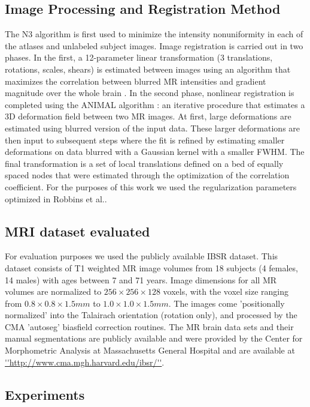 \documentclass{article}
\begin{document}
\subsection{Image Processing and Registration Method}
The N3 algorithm \cite{Sled1998} is first used to minimize the intensity
nonuniformity in each of the atlases and unlabeled subject images.  Image
registration is carried out in two phases.  In the first, a 12-parameter linear
transformation (3 translations, rotations, scales, shears) is estimated between
images using an algorithm that maximizes the correlation between blurred MR
intensities and gradient magnitude over the whole brain \cite{Collins}.  In the
second phase, nonlinear registration is completed using the ANIMAL algorithm
\cite{Collins1995}: an iterative procedure that estimates a 3D deformation
field between two MR images. At first, large deformations are estimated using
blurred version of the input data. These larger deformations are then input to
subsequent steps where the fit is refined by estimating smaller deformations on
data blurred with a Gaussian kernel with a smaller FWHM. The final
transformation is a set of local translations defined on a bed of equally
spaced nodes that were estimated through the optimization of the correlation
coefficient. For the purposes of this work we used the regularization
parameters optimized in Robbins et al.\cite{Robbins2004}.

\subsection{MRI dataset evaluated}

For evaluation purposes we used the publicly available IBSR dataset.  This
dataset consists of T1 weighted MR image volumes from 18 subjects (4 females,
14 males) with ages between 7 and 71 years. Image dimensions for all MR volumes
are normalized to  $256  \times 256 \times 128$ voxels, with the voxel size
ranging from $0.8 \times 0.8 \times 1.5 mm$ to $1.0 \times 1.0 \times 1.5 mm$.
The images come 'positionally normalized' into the Talairach orientation
(rotation only), and processed by the CMA 'autoseg' biasfield correction
routines. The MR brain data sets and their manual segmentations are publicly
available and were provided by the Center for Morphometric Analysis at
Massachusetts General Hospital and are available at
\url{''http://www.cma.mgh.harvard.edu/ibsr/''}.

\subsection{Experiments}
\end{document}
